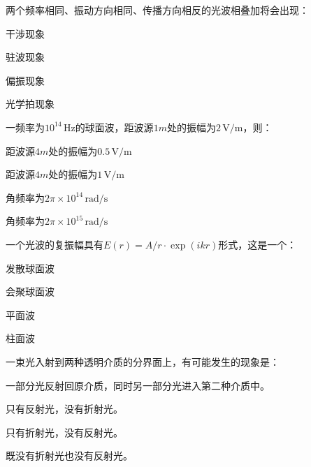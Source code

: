 \documentclass[padl, analysis, notocnum]{ExBook}
\newcommand{\answerarea}[1][3.5cm]{%
  \par\vspace{1mm}%
  \noindent{\color{themeColor!35}\rule{\linewidth}{0.4pt}}\par
  \noindent\begin{minipage}[t][#1][t]{\linewidth}\vspace{0pt}\end{minipage}\par
  \noindent{\color{themeColor!35}\rule{\linewidth}{0.4pt}}\par
}
\begin{document}
\begin{qitems}[startnum=8]
\qitem 两个频率相同、振动方向相同、传播方向相反的光波相叠加将会出现：
\par\noindent\hspace{2em}干涉现象
\par\noindent\hspace{2em}驻波现象
\par\noindent\hspace{2em}偏振现象
\par\noindent\hspace{2em}光学拍现象
\label{q:181:start}
\answerarea[4.0cm]
\label{q:181:end}
\end{qitems}

\begin{qitems}[startnum=9]
\qitem 一频率为$10^{14}\,\mathrm{Hz}$的球面波，距波源$1m$处的振幅为$2\,\mathrm{V/m}$，则：
\par\noindent\hspace{2em}距波源$4m$处的振幅为$0.5\,\mathrm{V/m}$
\par\noindent\hspace{2em}距波源$4m$处的振幅为$1\,\mathrm{V/m}$
\par\noindent\hspace{2em}角频率为$2\pi \times 10^{14}\,\mathrm{rad/s}$
\par\noindent\hspace{2em}角频率为$2\pi \times 10^{15}\,\mathrm{rad/s}$
\label{q:182:start}
\answerarea[4.0cm]
\label{q:182:end}
\end{qitems}

\begin{qitems}[startnum=10]
\qitem 一个光波的复振幅具有$E(r)=A/r\cdot \exp (ikr)$形式，这是一个：
\par\noindent\hspace{2em}发散球面波
\par\noindent\hspace{2em}会聚球面波
\par\noindent\hspace{2em}平面波
\par\noindent\hspace{2em}柱面波
\label{q:183:start}
\answerarea[4.0cm]
\label{q:183:end}
\end{qitems}

\begin{qitems}[startnum=11]
\qitem 一束光入射到两种透明介质的分界面上，有可能发生的现象是：
\par\noindent\hspace{2em}一部分光反射回原介质，同时另一部分光进入第二种介质中。
\par\noindent\hspace{2em}只有反射光，没有折射光。
\par\noindent\hspace{2em}只有折射光，没有反射光。
\par\noindent\hspace{2em}既没有折射光也没有反射光。
\label{q:184:start}
\answerarea[4.0cm]
\label{q:184:end}
\end{qitems}
\end{document}
